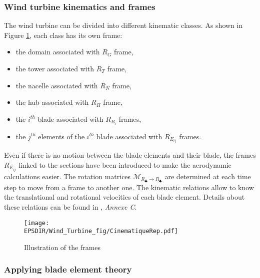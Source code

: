 \subsubsection*{Wind turbine kinematics and frames}		
\label{ss:EOL_M_cinematiqueAL}

The wind turbine can be divided into different kinematic classes. As shown in Figure \ref{fig:ALrep}, each class has its own frame:
\begin{multicols}{2}
\begin{itemize}
\item the domain associated with $R_G$ frame,
\item the tower associated with $R_T$ frame,
\item the nacelle associated with $R_N$ frame,
\item the hub associated with $R_H$ frame,
\item the $i^{th}$ blade associated with $R_{B_i}$ frames,
\item the $j^{th}$ elements of the $i^{th}$ blade associated with $R_{E_{ij}}$ frames.
\end{itemize}
\end{multicols}
\medbreak
Even if there is no motion between the blade elements and their blade, the frames $R_{E_{ij}}$ linked to the sections have been introduced to make the aerodynamic calculations easier. The rotation matrices $\mathcal{M}_{R_\clubsuit \rightarrow R_\spadesuit}$ are determined at each time step to move from a frame to another one. The kinematic relations allow to know the translational and rotational velocities of each blade element. Details about these relations can be found in \citet{joulin2019modelisation}, \textit{Annexe C}.
\medbreak
\begin{figure}[h]
\hspace{-1.8cm}
\texttt{[image: \\EPSDIR/Wind\_Turbine\_fig/CinematiqueRep.pdf]}
\caption{Illustration of the frames \citet{joulin2019modelisation}}  
\label{fig:ALrep}
\end{figure}

\subsubsection*{Applying blade element theory}
										

